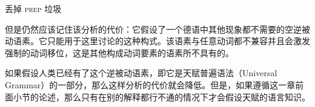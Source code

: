 \begin{exe}
\begin{xlist}[iv.]
\begin{exe}
\begin{xlist}[iv.]
{{	丢掉 \textsc{prep}  垃圾\\
}
\zl}

\noindent
但是仍然应该记住该分析的代价：它假设了一个德语中其他现象都不需要的空逆被动语素。它只能用于这里讨论的这种构式。该语素与任意动词都不兼容并且会激发强制的动词移位，这是其他构成动词要素的语素所不具有的。

如果假设人类已经有了这个逆被动语素，即它是天赋普遍语法\indexug（Universal Grammar）的一部分，那么这样分析的代价就会降低。但是，如果遵循这一章前面小节的论述，那么只有在别的解释都行不通的情况下才会假设天赋的语言知识。


\end{xlist}
\end{exe}
\end{xlist}
\end{exe}
